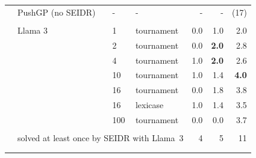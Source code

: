 \begin{table}[t]
\begin{tabular}{llllrrr}
\cline{2-7}\\[-8pt]
   &  PushGP (no SEIDR) & -   &    -            &       - &        - &      (17)\\[1pt]
\cline{2-7}\\[-8pt]
        & Llama 3 & 1   &         tournament &     0.0 &      1.0 &       2.0 \\
       &        & 2   &         tournament &     0.0 &      \textbf{2.0} &       2.8 \\
       &        & 4   &         tournament &     1.0 &     \textbf{ 2.0} &       2.6 \\
       &        & 10  &         tournament &     1.0 &      1.4 &       \textbf{4.0} \\
       &        & 16  &         tournament &     0.0 &      1.8 &       3.8 \\
       &        & 16  &           lexicase &    1.0 &      1.4 &       3.5 \\
       &        & 100 &         tournament &     0.0 &      0.0 &       3.7 \\[1pt]
\cline{3-7}\\[-8pt]
       & \multicolumn{3}{l}{solved at least once by SEIDR with Llama~3}  & 4 &        5 &       11  \\
\bottomrule
\\ %
\\ %
\end{tabular}
\end{table}


